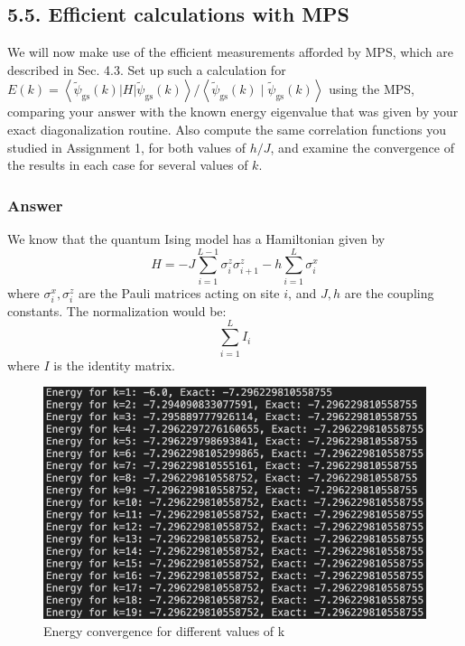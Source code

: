 \documentclass[12pt]{article}
\begin{document}
\subsection*{5.5. Efficient calculations with MPS}
We will now make use of the efficient measurements afforded by MPS, which are described in Sec. 4.3. Set up such a calculation for $E(k)=\left\langle\tilde{\psi}_{\mathrm{gs}}(k)|H| \tilde{\psi}_{\mathrm{gs}}(k)\right\rangle /\left\langle\tilde{\psi}_{\mathrm{gs}}(k) \mid \tilde{\psi}_{\mathrm{gs}}(k)\right\rangle$ using the MPS, comparing your answer with the known energy eigenvalue that was given by your exact diagonalization routine. Also compute the same correlation functions you studied in Assignment 1, for both values of $h / J$, and examine the convergence of the results in each case for several values of $k$.
\subsubsection{Answer}
We know that the quantum Ising model has a Hamiltonian given by
\begin{equation*}
H=-J \sum_{i=1}^{L-1} \sigma_{i}^{z} \sigma_{i+1}^{z}-h \sum_{i=1}^{L} \sigma_{i}^{x} \tag{1}
\end{equation*}
where $\sigma_{i}^{x}, \sigma_{i}^{z}$ are the Pauli matrices acting on site $i$, and $J, h$ are the coupling constants. The normalization would be:
\begin{equation}
    \sum_{i=1}^{L}I _i
\end{equation}
where $I$ is the identity matrix.
\newpage
\begin{figure}
    \centering
    \includegraphics[width=\textwidth]{mps_h.png}
    \caption{Energy convergence for different values of k}
\end{figure}
\end{document}
